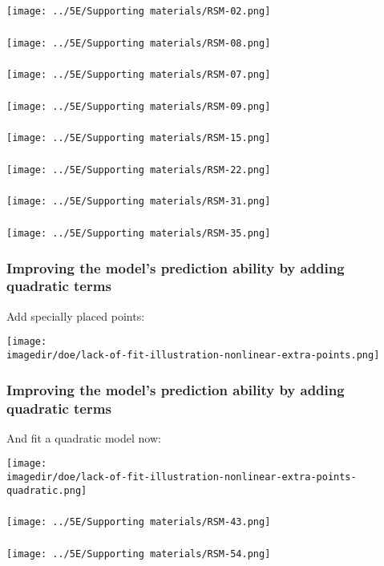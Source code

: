 \documentclass[11pt,aspectratio=169,mathserif]{beamer}
\begin{document}
\begin{frame}\frametitle{}
	\centerline{\texttt{[image: ../5E/Supporting materials/RSM-02.png]}}
\end{frame}
\begin{frame}\frametitle{}
	\centerline{\texttt{[image: ../5E/Supporting materials/RSM-08.png]}}
\end{frame}
\begin{frame}\frametitle{}
	\centerline{\texttt{[image: ../5E/Supporting materials/RSM-07.png]}}
\end{frame}
\begin{frame}\frametitle{}
	\centerline{\texttt{[image: ../5E/Supporting materials/RSM-09.png]}}
\end{frame}
\begin{frame}\frametitle{}
	\centerline{\texttt{[image: ../5E/Supporting materials/RSM-15.png]}}
\end{frame}
\begin{frame}\frametitle{}
	\centerline{\texttt{[image: ../5E/Supporting materials/RSM-22.png]}}
\end{frame}
\begin{frame}\frametitle{}
	\centerline{\texttt{[image: ../5E/Supporting materials/RSM-31.png]}}
\end{frame}
\begin{frame}\frametitle{}
	\centerline{\texttt{[image: ../5E/Supporting materials/RSM-35.png]}}
\end{frame}
\begin{frame}\frametitle{Improving the model's prediction ability by adding quadratic terms}
	Add specially placed points:
	
	\centerline{\texttt{[image: \\imagedir/doe/lack-of-fit-illustration-nonlinear-extra-points.png]}}
\end{frame}
\begin{frame}\frametitle{Improving the model's prediction ability by adding quadratic terms}
	And fit a quadratic model now:
	
	\centerline{\texttt{[image: \\imagedir/doe/lack-of-fit-illustration-nonlinear-extra-points-quadratic.png]}}
\end{frame}
\begin{frame}\frametitle{}
	\centerline{\texttt{[image: ../5E/Supporting materials/RSM-43.png]}}
\end{frame}
\begin{frame}\frametitle{}
	\centerline{\texttt{[image: ../5E/Supporting materials/RSM-54.png]}}
\end{frame}
\end{document}
